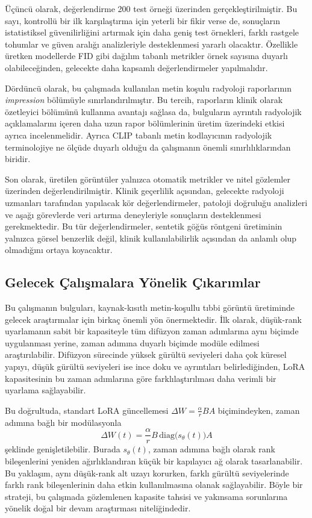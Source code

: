 \documentclass[11pt]{article}
\begin{document}
Üçüncü olarak, değerlendirme 200 test örneği üzerinden gerçekleştirilmiştir.
Bu sayı, kontrollü bir ilk karşılaştırma için yeterli bir fikir verse de,
sonuçların istatistiksel güvenilirliğini artırmak için daha geniş test
örnekleri, farklı rastgele tohumlar ve güven aralığı analizleriyle desteklenmesi
yararlı olacaktır. Özellikle üretken modellerde FID gibi dağılım tabanlı
metrikler örnek sayısına duyarlı olabileceğinden, gelecekte daha kapsamlı
değerlendirmeler yapılmalıdır.

Dördüncü olarak, bu çalışmada kullanılan metin koşulu radyoloji raporlarının
\emph{impression} bölümüyle sınırlandırılmıştır. Bu tercih, raporların klinik
olarak özetleyici bölümünü kullanma avantajı sağlasa da, bulguların ayrıntılı
radyolojik açıklamalarını içeren daha uzun rapor bölümlerinin üretim üzerindeki
etkisi ayrıca incelenmelidir. Ayrıca CLIP tabanlı metin kodlayıcının radyolojik
terminolojiye ne ölçüde duyarlı olduğu da çalışmanın önemli sınırlılıklarından
biridir.

Son olarak, üretilen görüntüler yalnızca otomatik metrikler ve nitel gözlemler
üzerinden değerlendirilmiştir. Klinik geçerlilik açısından, gelecekte radyoloji
uzmanları tarafından yapılacak kör değerlendirmeler, patoloji doğruluğu
analizleri ve aşağı görevlerde veri artırma deneyleriyle sonuçların
desteklenmesi gerekmektedir. Bu tür değerlendirmeler, sentetik göğüs röntgeni
üretiminin yalnızca görsel benzerlik değil, klinik kullanılabilirlik açısından
da anlamlı olup olmadığını ortaya koyacaktır.

\subsection{Gelecek Çalışmalara Yönelik Çıkarımlar}

Bu çalışmanın bulguları, kaynak-kısıtlı metin-koşullu tıbbi görüntü üretiminde
gelecek araştırmalar için birkaç önemli yön önermektedir. İlk olarak,
düşük-rank uyarlamanın sabit bir kapasiteyle tüm difüzyon zaman adımlarına aynı
biçimde uygulanması yerine, zaman adımına duyarlı biçimde modüle edilmesi
araştırılabilir. Difüzyon sürecinde yüksek gürültü seviyeleri daha çok küresel
yapıyı, düşük gürültü seviyeleri ise ince doku ve ayrıntıları belirlediğinden,
LoRA kapasitesinin bu zaman adımlarına göre farklılaştırılması daha verimli bir
uyarlama sağlayabilir.

Bu doğrultuda, standart LoRA güncellemesi
$\Delta W = \frac{\alpha}{r}BA$ biçimindeyken, zaman adımına bağlı bir
modülasyonla
\begin{equation}
\Delta W(t) =
\frac{\alpha}{r}
B\,\mathrm{diag}\big(s_\theta(t)\big)A
\label{eq:future_temporal_lora}
\end{equation}
şeklinde genişletilebilir. Burada $s_\theta(t)$, zaman adımına bağlı olarak
rank bileşenlerini yeniden ağırlıklandıran küçük bir kapılayıcı ağ olarak
tasarlanabilir. Bu yaklaşım, aynı düşük-rank alt uzayı korurken, farklı gürültü
seviyelerinde farklı rank bileşenlerinin daha etkin kullanılmasına olanak
sağlayabilir. Böyle bir strateji, bu çalışmada gözlemlenen kapasite tahsisi ve
yakınsama sorunlarına yönelik doğal bir devam araştırması niteliğindedir.
\end{document}
